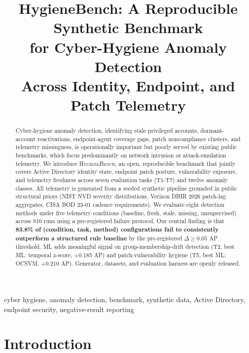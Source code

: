 \documentclass[conference]{IEEEtran}
\newcommand{\hb}{\textsc{HygieneBench}\xspace}
\begin{document}
\title{HygieneBench: A Reproducible Synthetic Benchmark\\
       for Cyber-Hygiene Anomaly Detection\\
       Across Identity, Endpoint, and Patch Telemetry}

\author{
}

\maketitle

\begin{abstract}
Cyber-hygiene anomaly detection, identifying stale privileged accounts,
dormant-account reactivations, endpoint-agent coverage gaps, patch noncompliance
clusters, and telemetry missingness, is operationally important but poorly served
by existing public benchmarks, which focus predominantly on network intrusion or
attack-emulation telemetry. We introduce \hb, an open, reproducible benchmark that
jointly covers Active Directory identity state, endpoint patch posture,
vulnerability exposure, and telemetry freshness across seven evaluation tasks
(T1-T7) and twelve anomaly classes. All telemetry is generated from a seeded
synthetic pipeline grounded in public structural priors (NIST NVD severity
distributions, Verizon DBIR 2026 patch-lag aggregates, CISA BOD 23-01
cadence requirements). We evaluate eight detection methods under five telemetry
conditions (baseline, fresh, stale, missing, unsupervised) across 810 runs using a
pre-registered failure protocol. Our central finding is that \textbf{83.8\% of
(condition, task, method) configurations fail to consistently outperform a
structured rule baseline} by the pre-registered \(\Delta\!\geq\!0.05\) AP
threshold. ML adds meaningful signal on group-membership-drift detection (T2, best
ML: temporal z-score, \(+\)0.185 AP) and patch-vulnerability hygiene (T5, best ML:
OCSVM, \(+\)0.210 AP). Generator, datasets, and evaluation harness are openly
released.
\end{abstract}

\begin{IEEEkeywords}
cyber hygiene, anomaly detection, benchmark, synthetic data, Active Directory,
endpoint security, negative-result reporting
\end{IEEEkeywords}

\section{Introduction}
\label{sec:intro}
\end{document}
